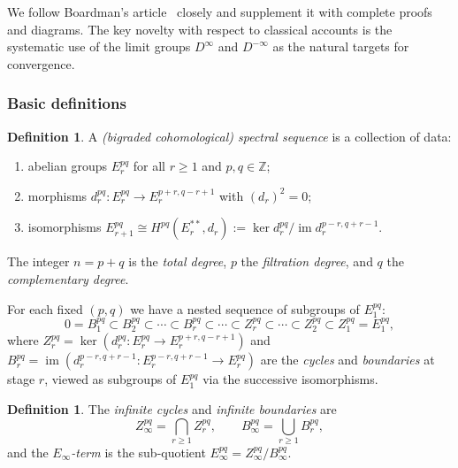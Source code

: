 \documentclass[12pt,a4paper]{article}
\theoremstyle{definition}
\newtheorem{definition}[theorem]{Definition}
\newcommand{\Z}{\mathbb{Z}}
\begin{document}
We follow Boardman's article~\cite{Boa99} closely and supplement it with complete
proofs and diagrams.  The key novelty with respect to classical accounts is the
systematic use of the limit groups $D^\infty$ and $D^{-\infty}$ as the natural
targets for convergence.

\subsubsection{Basic definitions}

\begin{definition}\label{def:spectral-sequence}
A \emph{(bigraded cohomological) spectral sequence} is a collection of data:
\begin{enumerate}
  \item abelian groups $E_r^{pq}$ for all $r\geq 1$ and $p,q\in\Z$;
  \item morphisms $d_r^{pq}:E_r^{pq}\to E_r^{p+r,q-r+1}$ with $(d_r)^2=0$;
  \item isomorphisms $E_{r+1}^{pq}\cong H^{pq}(E_r^{**},d_r)
    :=\ker d_r^{pq}\big/\operatorname{im} d_r^{p-r,q+r-1}$.
\end{enumerate}
The integer $n=p+q$ is the \emph{total degree}, $p$ the \emph{filtration degree},
and $q$ the \emph{complementary degree}.
\end{definition}

For each fixed $(p,q)$ we have a nested sequence of subgroups of $E_1^{pq}$:
\[
  0 = B_1^{pq} \subset B_2^{pq} \subset \cdots \subset B_r^{pq}
  \subset \cdots \subset Z_r^{pq} \subset \cdots \subset Z_2^{pq}
  \subset Z_1^{pq} = E_1^{pq},
\]
where $Z_r^{pq}=\ker(d_r^{pq}:E_r^{pq}\to E_r^{p+r,q-r+1})$ and
$B_r^{pq}=\operatorname{im}(d_r^{p-r,q+r-1}:E_r^{p-r,q+r-1}\to E_r^{pq})$
are the \emph{cycles} and \emph{boundaries} at stage $r$, viewed as subgroups
of $E_1^{pq}$ via the successive isomorphisms.

\begin{definition}\label{def:infinite-terms}
The \emph{infinite cycles} and \emph{infinite boundaries} are
\[
  Z_\infty^{pq} = \bigcap_{r\geq 1} Z_r^{pq},\qquad
  B_\infty^{pq} = \bigcup_{r\geq 1} B_r^{pq},
\]
and the \emph{$E_\infty$-term} is the sub-quotient
$E_\infty^{pq} = Z_\infty^{pq}/B_\infty^{pq}$.
\end{definition}
\end{document}
